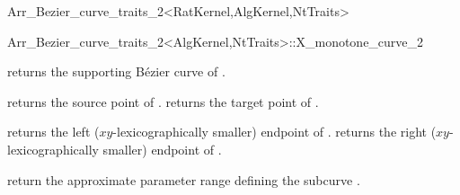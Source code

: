 \begin{ccRefClass}{Arr_Bezier_curve_traits_2<RatKernel,AlgKernel,NtTraits>}
\begin{ccClass}{Arr_Bezier_curve_traits_2<AlgKernel,NtTraits>::X_monotone_curve_2}
\ccAccessFunctions

  {returns the supporting B\'ezier curve of \ccVar.}

  {returns the source point of \ccVar.}
\ccGlue
{}
  {returns the target point of \ccVar.}

  {returns the left ($xy$-lexicographically smaller) endpoint of \ccVar.}
\ccGlue
{}
  {returns the right ($xy$-lexicographically smaller) endpoint of \ccVar.}

  {return the approximate parameter range defining the subcurve \ccVar.}

\end{ccClass}

\end{ccRefClass}
\ccRefPageEnd
